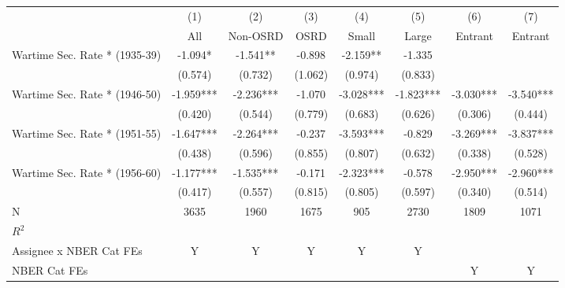 {
\def\sym#1{\ifmmode^{#1}\else\(^{#1}\)\fi}
\begin{tabular}{l*{7}{c}}
\hline\hline
                                                &\multicolumn{1}{c}{(1)}&\multicolumn{1}{c}{(2)}&\multicolumn{1}{c}{(3)}&\multicolumn{1}{c}{(4)}&\multicolumn{1}{c}{(5)}&\multicolumn{1}{c}{(6)}&\multicolumn{1}{c}{(7)}\\
                                                &\multicolumn{1}{c}{All}&\multicolumn{1}{c}{Non-OSRD}&\multicolumn{1}{c}{OSRD}&\multicolumn{1}{c}{Small}&\multicolumn{1}{c}{Large}&\multicolumn{1}{c}{Entrant}&\multicolumn{1}{c}{Entrant}\\
\hline
Wartime Sec. Rate * (1935-39)                   &      -1.094*  &      -1.541** &      -0.898   &      -2.159** &      -1.335   &               &               \\
                                                &     (0.574)   &     (0.732)   &     (1.062)   &     (0.974)   &     (0.833)   &               &               \\
Wartime Sec. Rate * (1946-50)                   &      -1.959***&      -2.236***&      -1.070   &      -3.028***&      -1.823***&      -3.030***&      -3.540***\\
                                                &     (0.420)   &     (0.544)   &     (0.779)   &     (0.683)   &     (0.626)   &     (0.306)   &     (0.444)   \\
Wartime Sec. Rate * (1951-55)                   &      -1.647***&      -2.264***&      -0.237   &      -3.593***&      -0.829   &      -3.269***&      -3.837***\\
                                                &     (0.438)   &     (0.596)   &     (0.855)   &     (0.807)   &     (0.632)   &     (0.338)   &     (0.528)   \\
Wartime Sec. Rate * (1956-60)                   &      -1.177***&      -1.535***&      -0.171   &      -2.323***&      -0.578   &      -2.950***&      -2.960***\\
                                                &     (0.417)   &     (0.557)   &     (0.815)   &     (0.805)   &     (0.597)   &     (0.340)   &     (0.514)   \\
\hline
N                                               &        3635   &        1960   &        1675   &         905   &        2730   &        1809   &        1071   \\
$R^2$                                           &               &               &               &               &               &               &               \\
Assignee x NBER Cat FEs                         &           Y   &           Y   &           Y   &           Y   &           Y   &               &               \\
NBER Cat FEs                                    &               &               &               &               &               &           Y   &           Y   \\
\hline\hline
\end{tabular}
}
